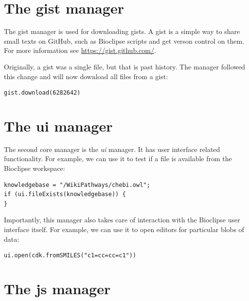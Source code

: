 \documentclass[a5paper, 10pt]{memoir}
\renewcommand{\todo}[1]{{\color{white}\oldtodo{\textsf{#1}}}}
\begin{document}
\begin{refsection}
\section{The gist manager}

The gist manager is used for downloading gists. A gist is a simple way to share
small texts on GitHub, such as Bioclipse scripts and get verson
control on them. For more information see \url{https://gist.github.com/}.

Originally, a gist was a single file, but that is past history. The manager
followed this change and will now download all files from a
gist:

\begin{Verbatim}
gist.download(6282642)
\end{Verbatim}


\section{The ui manager}

The second core manager is the \emph{ui} manager. It has user interface related
functionality. For example, we can use it to test if a file is available from
the Bioclipse workspace:

\begin{Verbatim}
knowledgebase = "/WikiPathways/chebi.owl";
if (ui.fileExists(knowledgebase)) {
}
\end{Verbatim}
Importantly, this manager also takes care of interaction with the Bioclipse
user interface itself. For example, we can use it to open editors for
particular blobs of data:

\begin{Verbatim}
ui.open(cdk.fromSMILES("c1=cc=cc=c1"))
\end{Verbatim}

\section{The js manager}
\todo{extend}


\end{refsection}
\end{document}
